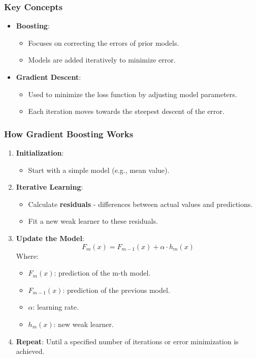 \documentclass[aspectratio=169]{beamer}
\begin{document}
\begin{frame}[fragile]
    \frametitle{Key Concepts}
    \begin{itemize}
        \item \textbf{Boosting}:
            \begin{itemize}
                \item Focuses on correcting the errors of prior models.
                \item Models are added iteratively to minimize error.
            \end{itemize}
        \item \textbf{Gradient Descent}:
            \begin{itemize}
                \item Used to minimize the loss function by adjusting model parameters.
                \item Each iteration moves towards the steepest descent of the error.
            \end{itemize}
    \end{itemize}
\end{frame}

\begin{frame}[fragile]
    \frametitle{How Gradient Boosting Works}
    \begin{enumerate}
        \item \textbf{Initialization}:
            \begin{itemize}
                \item Start with a simple model (e.g., mean value).
            \end{itemize}
        \item \textbf{Iterative Learning}:
            \begin{itemize}
                \item Calculate \textbf{residuals} - differences between actual values and predictions.
                \item Fit a new weak learner to these residuals.
            \end{itemize}
        \item \textbf{Update the Model}:
            \begin{equation}
            F_{m}(x) = F_{m-1}(x) + \alpha \cdot h_m(x)
            \end{equation}
            Where:
            \begin{itemize}
                \item $F_{m}(x)$: prediction of the m-th model.
                \item $F_{m-1}(x)$: prediction of the previous model.
                \item $\alpha$: learning rate.
                \item $h_m(x)$: new weak learner.
            \end{itemize}
        \item \textbf{Repeat}: Until a specified number of iterations or error minimization is achieved.
    \end{enumerate}
\end{frame}
\end{document}

